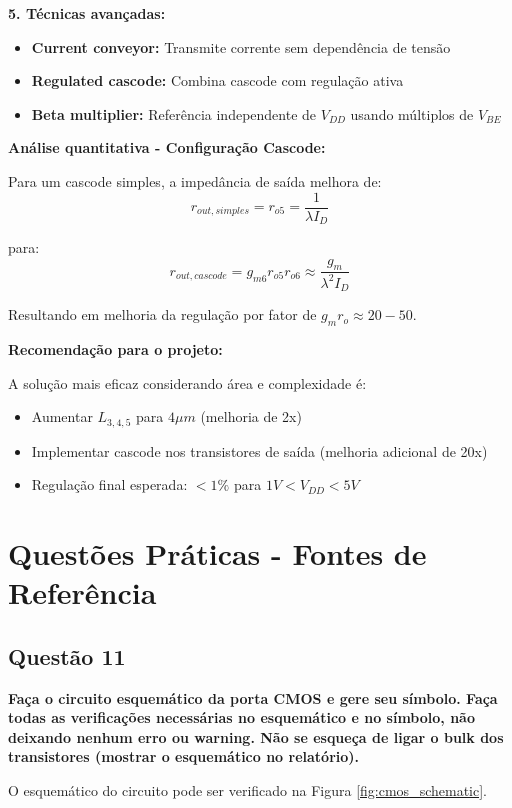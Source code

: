 \documentclass[12pt,a4paper]{article}
\begin{document}
\t\textbf{5. Técnicas avançadas:}
\begin{itemize}
    \item \t\textbf{Current conveyor:} Transmite corrente sem dependência de tensão
    \item \t\textbf{Regulated cascode:} Combina cascode com regulação ativa
    \item \t\textbf{Beta multiplier:} Referência independente de $V_{DD}$ usando múltiplos de $V_{BE}$
\end{itemize}

\t\textbf{Análise quantitativa - Configuração Cascode:}

Para um cascode simples, a impedância de saída melhora de:
$$r_{out,simples} = r_{o5} = \frac{1}{\lambda I_D} $$

para:
$$r_{out,cascode} = g_{m6} r_{o5} r_{o6} \approx \frac{g_m}{\lambda^2 I_D} $$

Resultando em melhoria da regulação por fator de $g_m r_o \approx 20-50$.

\t\textbf{Recomendação para o projeto:}

A solução mais eficaz considerando área e complexidade é:
\begin{itemize}
    \item Aumentar $L_{3,4,5}$ para $4\mu m$ (melhoria de 2x)
    \item Implementar cascode nos transistores de saída (melhoria adicional de 20x)
    \item Regulação final esperada: $< 1\%$ para $1V < V_{DD} < 5V$
\end{itemize}

\section{Questões Práticas - Fontes de Referência}

\subsection*{Questão 11}

	\textbf{Faça o circuito esquemático da porta CMOS e gere seu símbolo. Faça todas as verificações necessárias no esquemático e no símbolo, não deixando nenhum erro ou warning. Não se esqueça de ligar o bulk dos transistores (mostrar o esquemático no relatório).}

O esquemático do circuito pode ser verificado na Figura \ref{fig:cmos_schematic}.
\end{document}
